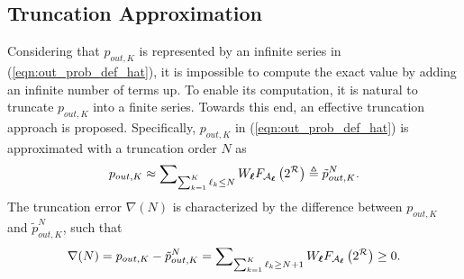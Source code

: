 \documentclass[12pt,onecolumn,draftcls]{IEEEtran}
\newcommand{\bs}{\boldsymbol}
\begin{document}
\subsection{Truncation Approximation}
Considering that $p_{out,K}$ is represented by an infinite series in (\ref{eqn:out_prob_def_hat}), it is impossible to compute the exact value by adding an infinite number of terms up. To enable its computation, it is natural to truncate $p_{out,K}$ into a finite series. Towards this end, an effective truncation approach is proposed. Specifically, $p_{out,K}$ in (\ref{eqn:out_prob_def_hat}) is approximated with a truncation order $N$ as
\begin{equation}\label{eqn:F_G_x_trunc_ser}
 p_{out,K} \approx {\sum\nolimits_{{\sum\nolimits_{k=1}^K  \ell_k \le N}} {{W_{\bs{\ell}}}{F_{{ {\cal A}_{\bs{\ell}}}}}\left( 2^{\cal R} \right)} }  \triangleq \tilde p_{out,K}^N.
\end{equation}
%
%
The truncation error $\nabla(N)$ is characterized by the difference between $p_{out,K}$ and $\tilde p_{out,K}^N$, such that
\begin{equation}\label{eqn:trun_err_prod_gam}
 \nabla(N)= p_{out,K} - \tilde p_{out,K}^N = {\sum\nolimits_{{\sum\nolimits_{k=1}^K  \ell_k \ge N+1}}  {{W_{\bs{\ell}}}{F_{{ {\cal A}_{\bs{\ell}}}}}\left( 2^{\cal R} \right)} }  \ge 0.
\end{equation}
\end{document}
